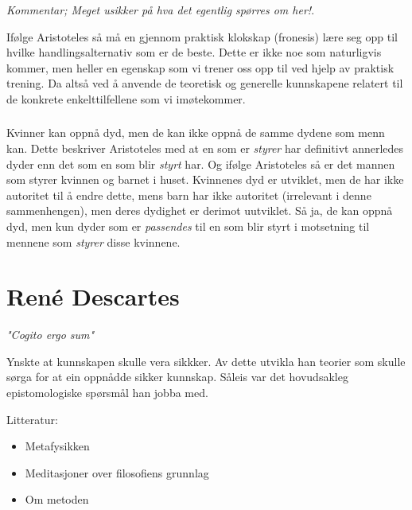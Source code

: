 \documentclass[a4paper]{IEEEtran}
\begin{document}
        \subsubsection{}
        \textit{Kommentar; Meget usikker på hva det egentlig spørres om her!}.

        Ifølge Aristoteles så må en gjennom praktisk klokskap (fronesis) lære 
        seg opp til hvilke handlingsalternativ som er de beste. Dette 
        er ikke noe som naturligvis kommer, men heller en egenskap som vi trener 
        oss opp til ved hjelp av praktisk trening. Da altså ved å anvende 
        de teoretisk og generelle kunnskapene relatert til de konkrete 
        enkelttilfellene som vi imøtekommer. \medskip 

        \subsubsection{}
        Kvinner kan oppnå dyd, men de kan ikke oppnå de samme dydene som menn kan. 
        Dette beskriver Aristoteles med at en som er \textit{styrer} har definitivt 
        annerledes dyder enn det som en som blir \textit{styrt} har. Og ifølge 
        Aristoteles så er det mannen som styrer kvinnen og barnet i huset. 
        Kvinnenes dyd er utviklet, men de har ikke autoritet til å endre dette, 
        mens barn har ikke autoritet (irrelevant i denne sammenhengen), men deres 
        dydighet er derimot uutviklet. Så ja, de kan oppnå dyd, men kun dyder som 
        er \textit{passendes} til en som blir styrt i motsetning til mennene som
        \textit{styrer} disse kvinnene.
\bigskip
\section{René Descartes}
\label{descartes}\bigskip
\begin{center}
    \textit{"Cogito ergo sum"}\bigskip    
\end{center}


Ynskte at kunnskapen skulle vera sikkker. Av dette utvikla han teorier som skulle sørga for at ein oppnådde sikker kunnskap. Såleis var det hovudsakleg epistomologiske spørsmål han jobba med.

\bigskip
Litteratur:
\begin{itemize}
    \item Metafysikken
    \item Meditasjoner over filosofiens grunnlag
    \item Om metoden
\end{itemize}\bigskip 
\end{document}
